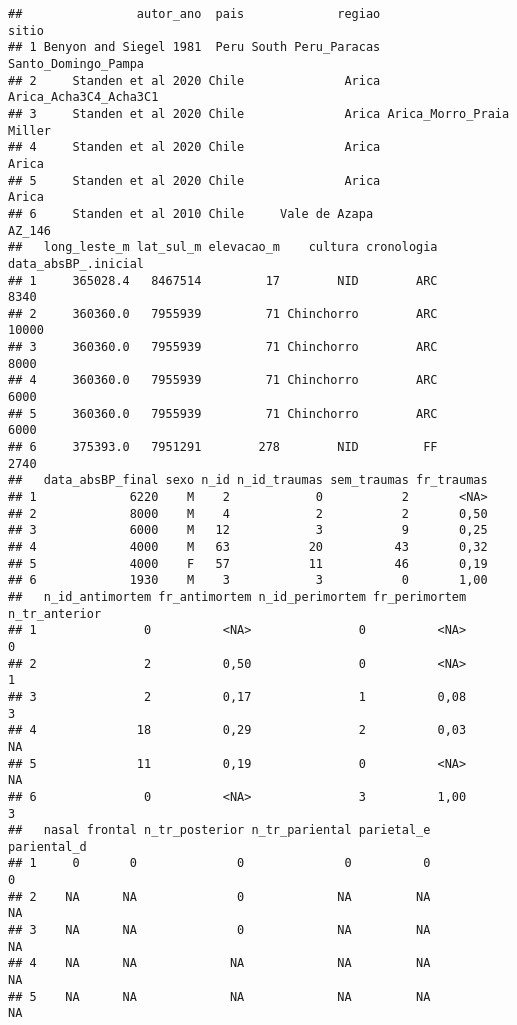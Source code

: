 \documentclass[
]{article}
\begin{document}
\begin{verbatim}
##                autor_ano  pais             regiao                    sitio
## 1 Benyon and Siegel 1981  Peru South Peru_Paracas      Santo_Domingo_Pampa
## 2     Standen et al 2020 Chile              Arica    Arica_Acha3C4_Acha3C1
## 3     Standen et al 2020 Chile              Arica Arica_Morro_Praia Miller
## 4     Standen et al 2020 Chile              Arica                    Arica
## 5     Standen et al 2020 Chile              Arica                    Arica
## 6     Standen et al 2010 Chile     Vale de Azapa                    AZ_146
##   long_leste_m lat_sul_m elevacao_m    cultura cronologia data_absBP_.inicial
## 1     365028.4   8467514         17        NID        ARC                8340
## 2     360360.0   7955939         71 Chinchorro        ARC               10000
## 3     360360.0   7955939         71 Chinchorro        ARC                8000
## 4     360360.0   7955939         71 Chinchorro        ARC                6000
## 5     360360.0   7955939         71 Chinchorro        ARC                6000
## 6     375393.0   7951291        278        NID         FF                2740
##   data_absBP_final sexo n_id n_id_traumas sem_traumas fr_traumas
## 1             6220    M    2            0           2       <NA>
## 2             8000    M    4            2           2       0,50
## 3             6000    M   12            3           9       0,25
## 4             4000    M   63           20          43       0,32
## 5             4000    F   57           11          46       0,19
## 6             1930    M    3            3           0       1,00
##   n_id_antimortem fr_antimortem n_id_perimortem fr_perimortem n_tr_anterior
## 1               0          <NA>               0          <NA>             0
## 2               2          0,50               0          <NA>             1
## 3               2          0,17               1          0,08             3
## 4              18          0,29               2          0,03            NA
## 5              11          0,19               0          <NA>            NA
## 6               0          <NA>               3          1,00             3
##   nasal frontal n_tr_posterior n_tr_pariental parietal_e pariental_d
## 1     0       0              0              0          0           0
## 2    NA      NA              0             NA         NA          NA
## 3    NA      NA              0             NA         NA          NA
## 4    NA      NA             NA             NA         NA          NA
## 5    NA      NA             NA             NA         NA          NA

\end{verbatim}
\end{document}
